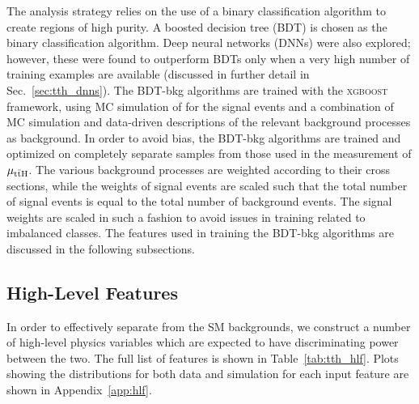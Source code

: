 The analysis strategy relies on the use of a binary classification algorithm to create regions of high \ttH purity.
A boosted decision tree (BDT) is chosen as the binary classification algorithm.
Deep neural networks (DNNs) were also explored; however, these were found to outperform BDTs only when a very high number of training examples are available (discussed in further detail in Sec.~\ref{sec:tth_dnns}).
The BDT-bkg algorithms are trained with the \textsc{xgboost}~\cite{xgboost} framework, using MC simulation of \ttH for the signal events and a combination of MC simulation and data-driven descriptions of the relevant background processes as background.
In order to avoid bias, the BDT-bkg algorithms are trained and optimized on completely separate samples from those used in the measurement of $\mu_{\mathrm{t\bar{t}H}}$.
The various background processes are weighted according to their cross sections, while the weights of signal events are scaled such that the total number of signal events is equal to the total number of background events.
The signal weights are scaled in such a fashion to avoid issues in training related to imbalanced classes.
The features used in training the BDT-bkg algorithms are discussed in the following subsections. 

\subsection{High-Level Features} \label{sec:tth_hlf}
In order to effectively separate \ttH from the SM backgrounds, we construct a number of high-level physics variables which are expected to have discriminating power between the two.
The full list of features is shown in Table~\ref{tab:tth_hlf}.
Plots showing the distributions for both data and simulation for each input feature are shown in Appendix~\ref{app:hlf}.

